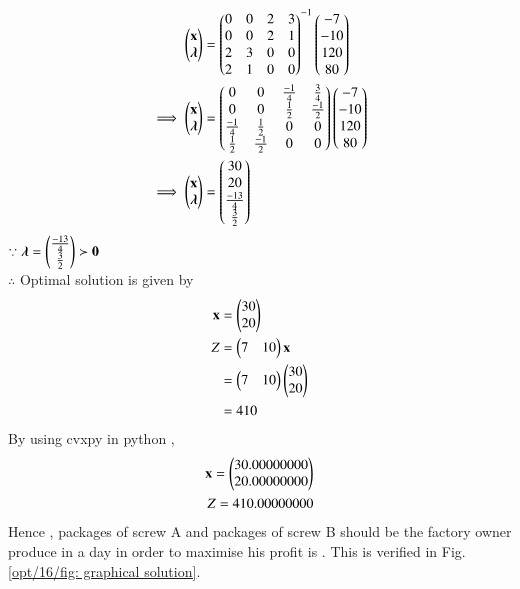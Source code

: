 \begin{align}
    \begin{pmatrix}\mathbf{x} \\ \boldsymbol{\lambda}\end{pmatrix} &= \begin{pmatrix}0 & 0 & 2 & 3 \\ 0 & 0 & 2 & 1 \\ 2 & 3 & 0 & 0 \\ 2 & 1 & 0 & 0\end{pmatrix}^{-1}\begin{pmatrix}-7 \\ -10 \\ 120 \\ 80\end{pmatrix}
    \\
    \implies   \begin{pmatrix}\mathbf{x} \\ \boldsymbol{\lambda}\end{pmatrix} &= \begin{pmatrix}0 & 0 & \frac{-1}{4} & \frac{3}{4} \\ 0 & 0 & \frac{1}{2} & \frac{-1}{2} \\ \frac{-1}{4} & \frac{1}{2} & 0 & 0 \\ \frac{1}{2} & \frac{-1}{2} & 0 & 0\end{pmatrix}\begin{pmatrix}-7 \\ -10 \\ 120 \\ 80\end{pmatrix}
    \\
    \implies \begin{pmatrix}\mathbf{x} \\ \boldsymbol{\lambda}\end{pmatrix} &= \begin{pmatrix}30 \\ 20 \\ \frac{-13}{4} \\ \frac{3}{2} \end{pmatrix}
\end{align}
$\because \boldsymbol{\lambda}=\begin{pmatrix}\frac{-13}{4} \\ \frac{3}{2}\end{pmatrix} \succ \mathbf{0} $ 
\\
$\therefore$ Optimal solution is given by
\begin{align}
    \mathbf{x} &= \begin{pmatrix}30\\20\end{pmatrix} \\
    Z &= \begin{pmatrix}7 & 10\end{pmatrix}\mathbf{x} \\
    &= \begin{pmatrix}7 & 10\end{pmatrix}\begin{pmatrix}30 \\ 20\end{pmatrix} \\
    &= 410
\end{align}
By using cvxpy in python ,
\begin{align}
    \mathbf{x}=\begin{pmatrix}30.00000000\\20.00000000\end{pmatrix}\\
    Z = 410.00000000
\end{align}
Hence , packages of screw A and  packages of screw B should be the factory owner produce in a day in order to maximise his  profit is .  This
is verified in Fig. \ref{opt/16/fig: graphical solution}.	
%
